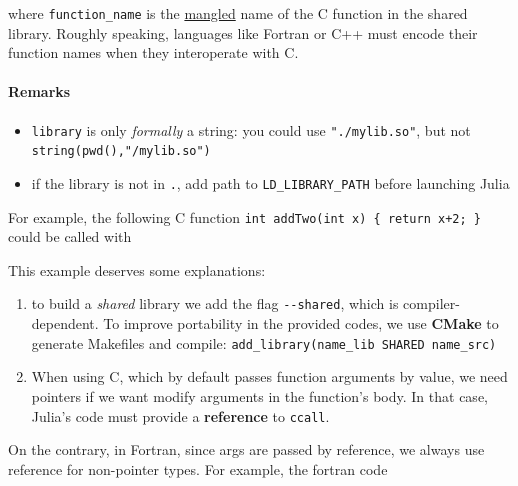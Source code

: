 \documentclass[11pt]{article}
\providecommand{\tightlist}{%
      \setlength{\itemsep}{0pt}\setlength{\parskip}{0pt}}
\newenvironment{Shaded}{}{}
\newcommand{\KeywordTok}[1]{\textcolor[rgb]{0.00,0.44,0.13}{\textbf{{#1}}}}
\newcommand{\DataTypeTok}[1]{\textcolor[rgb]{0.56,0.13,0.00}{{#1}}}
\newcommand{\FloatTok}[1]{\textcolor[rgb]{0.25,0.63,0.44}{{#1}}}
\newcommand{\StringTok}[1]{\textcolor[rgb]{0.25,0.44,0.63}{{#1}}}
\newcommand{\NormalTok}[1]{{#1}}
\newcommand{\SpecialStringTok}[1]{\textcolor[rgb]{0.73,0.40,0.53}{{#1}}}
\newcommand{\OperatorTok}[1]{\textcolor[rgb]{0.40,0.40,0.40}{{#1}}}
\begin{document}
where \texttt{function\_name} is the \href{https://en.wikipedia.org/wiki/Name_mangling}{mangled} 
name of the C function in the shared library. Roughly speaking, languages like Fortran or C++
must encode their function names when they interoperate with C.

\hypertarget{remarks}{%
\paragraph{Remarks}\label{remarks}}

\begin{itemize}
\tightlist
\item
  \texttt{library} is only \emph{formally} a string: you could use
  \texttt{"./mylib.so"}, but not \texttt{string(pwd(),"/mylib.so")}
\item
  if the library is not in \texttt{.}, add path to \texttt{LD\_LIBRARY\_PATH} before launching Julia 
\end{itemize}

For example, the following C function
\texttt{int\ addTwo(int\ x)\ \{\ return\ x+2;\ \}} could be called with
\begin{Shaded}
\end{Shaded}

This example deserves some explanations: 
\begin{enumerate}
\def\labelenumi{\arabic{enumi}.}
\setcounter{enumi}{0}
\item
  to build a \emph{shared} library we add the flag \texttt{-\/-shared}, which is 
  compiler-dependent. To improve portability in the provided codes, we use \textbf{CMake} 
  to generate Makefiles and compile: \texttt{add\_library(name\_lib\ SHARED\ name\_src)}
\item
  When using C, which by default passes function arguments by value, we need pointers if we want
  modify arguments in the function's body. In that case, Julia's code must provide a \textbf{reference} 
  to \texttt{ccall}.
\end{enumerate}
  On the contrary, in Fortran, since args are passed by reference, we always 
  use reference for non-pointer types. For example, the fortran code
\end{document}
